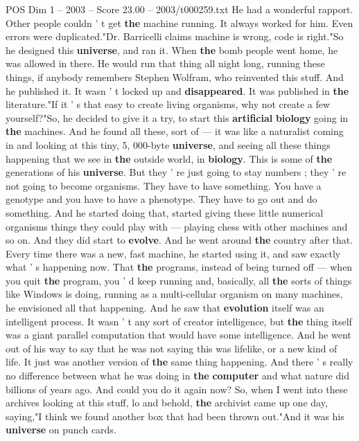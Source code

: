 \begin{textsample}{POS Dim 1 – 2003 – Score 23.00 – 2003/t000259.txt}
He had a wonderful rapport.
Other people couldn ' t get \textbf{the} machine running.
It always worked for him.
Even errors were duplicated."Dr.
Barricelli claims machine is wrong, code is right."So he designed this \textbf{universe}, and ran it.
When \textbf{the} bomb people went home, he was allowed in there.
He would run that thing all night long, running these things, if anybody remembers Stephen Wolfram, who reinvented this stuff.
And he published it.
It wasn ' t locked up and \textbf{disappeared}.
It was published in \textbf{the} literature."If it ' s that easy to create living organisms, why not create a few yourself?"So, he decided to give it a try, to start this \textbf{artificial} \textbf{biology} going in \textbf{the} machines.
And he found all these, sort of — it was like a naturalist coming in and looking at this tiny, 5, 000-byte \textbf{universe}, and seeing all these things happening that we see in \textbf{the} outside world, in \textbf{biology}.
This is some of \textbf{the} generations of his \textbf{universe}.
But they ' re just going to stay numbers ; they ' re not going to become organisms.
They have to have something.
You have a genotype and you have to have a phenotype.
They have to go out and do something.
And he started doing that, started giving these little numerical organisms things they could play with — playing chess with other machines and so on.
And they did start to \textbf{evolve}.
And he went around \textbf{the} country after that.
Every time there was a new, fast machine, he started using it, and saw exactly what ' s happening now.
That \textbf{the} programs, instead of being turned off — when you quit \textbf{the} program, you ' d keep running and, basically, all \textbf{the} sorts of things like Windows is doing, running as a multi-cellular organism on many machines, he envisioned all that happening.
And he saw that \textbf{evolution} itself was an intelligent process.
It wasn ' t any sort of creator intelligence, but \textbf{the} thing itself was a giant parallel computation that would have some intelligence.
And he went out of his way to say that he was not saying this was lifelike, or a new kind of life.
It just was another version of \textbf{the} same thing happening.
And there ' s really no difference between what he was doing in \textbf{the} \textbf{computer} and what nature did billions of years ago.
And could you do it again now?
So, when I went into these archives looking at this stuff, lo and behold, \textbf{the} archivist came up one day, saying,"I think we found another box that had been thrown out."And it was his \textbf{universe} on punch cards.

\end{textsample}
